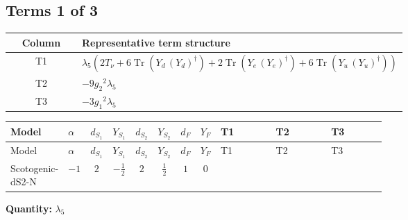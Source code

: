 \documentclass[8pt]{article}
\begin{document}
\begin{landscape}
\subsection*{Terms 1 of 3}
\begin{center}
\begin{tabular}{@{}c >{\raggedright\arraybackslash}p{0.82\linewidth}@{}}
\toprule
Column & Representative term structure \\
\midrule
T1 & \(\displaystyle {\lambda_5} (2 T_\nu+6 \operatorname{Tr}\!\left({Y_d}\,\left({Y_d}\right)^{\dagger}\right)+2 \operatorname{Tr}\!\left({Y_e}\,\left({Y_e}\right)^{\dagger}\right)+6 \operatorname{Tr}\!\left({Y_u}\,\left({Y_u}\right)^{\dagger}\right))\) \\
\midrule
T2 & \(\displaystyle -9 {g_2}^2 {\lambda_5}\) \\
\midrule
T3 & \(\displaystyle -3 {g_1}^2 {\lambda_5}\) \\
\midrule
\bottomrule
\end{tabular}
\end{center}
\smallskip
\tiny
\begin{longtable}{@{}llcccccc >{\raggedright\arraybackslash}p{0.21\linewidth} >{\raggedright\arraybackslash}p{0.21\linewidth} >{\raggedright\arraybackslash}p{0.21\linewidth}@{}}
\toprule
Model & $\alpha$ & $d_{S_1}$ & $Y_{S_1}$ & $d_{S_2}$ & $Y_{S_2}$ & $d_F$ & $Y_F$ & T1 & T2 & T3 \\
\midrule
\endfirsthead
\toprule
Model & $\alpha$ & $d_{S_1}$ & $Y_{S_1}$ & $d_{S_2}$ & $Y_{S_2}$ & $d_F$ & $Y_F$ & T1 & T2 & T3 \\
\midrule
\endhead
Scotogenic-dS2-N & $-1$ & $2$ & $-\frac{1}{2}$ & $2$ & $\frac{1}{2}$ & $1$ & $0$ & \scriptsize\adjustbox{max width=\linewidth}{$\begin{gathered} {\lambda_5} (2 T_\nu+6 \operatorname{Tr}\!\left({Y_d}\,\left({Y_d}\right)^{\dagger}\right)+2 \operatorname{Tr}\!\left({Y_e}\,\left({Y_e}\right)^{\dagger}\right)+6 \operatorname{Tr}\!\left({Y_u}\,\left({Y_u}\right)^{\dagger}\right))\end{gathered}$} & \scriptsize\adjustbox{max width=\linewidth}{$\begin{gathered} -9 {g_2}^2 {\lambda_5}\end{gathered}$} & \scriptsize\adjustbox{max width=\linewidth}{$\begin{gathered} -3 {g_1}^2 {\lambda_5}\end{gathered}$} \\
\midrule
\bottomrule
\end{longtable}
\clearpage
\noindent\textbf{Quantity: }$\lambda_5$\par\smallskip

\end{landscape}
\end{document}
